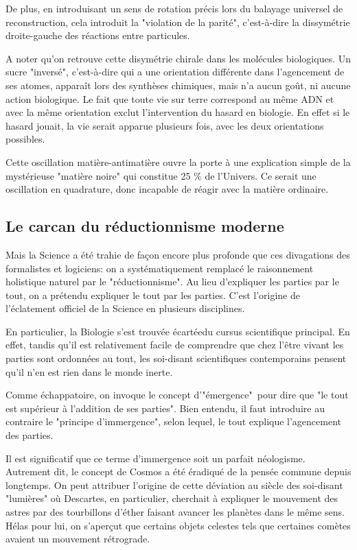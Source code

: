 \documentclass[a4paper,12pt]{article}
\begin{document}
De plus, en introduisant un sens de rotation précis lors du balayage universel de reconstruction, cela introduit la "violation de la parité", c'est-à-dire la dissymétrie droite-gauche des réactions entre particules. 

A noter qu'on retrouve cette disymétrie chirale dans les molécules biologiques. Un sucre "inversé", c'est-à-dire qui a une orientation différente dans l'agencement de ses atomes, apparaît lors des synthèses chimiques, mais n'a aucun goût, ni aucune action biologique. Le fait que toute vie sur terre correspond au même ADN et avec la même orientation exclut l'intervention du hasard en biologie. En effet si le hasard jouait, la vie serait apparue plusieurs fois, avec les deux orientations possibles.

Cette oscillation matière-antimatière ouvre la porte à une explication simple de la mystérieuse "matière noire" qui constitue 25 \% de l'Univers. Ce serait une oscillation en quadrature, donc incapable de réagir avec la matière ordinaire. 


\subsection{Le carcan du réductionnisme moderne}

    Mais la Science a été trahie de façon encore plus profonde que ces divagations des formalistes et logiciens: on a systématiquement remplacé le raisonnement holistique naturel par le "réductionnisme". Au lieu d'expliquer les parties par le tout, on a prétendu expliquer le tout par les parties. C'est l'origine de l'éclatement officiel de la Science en plusieurs disciplines.

     En particulier, la Biologie s'est trouvée écartéedu cursus scientifique principal.  En effet, tandis qu'il est relativement facile de comprendre que chez l'être vivant les parties sont ordonnées au tout, les soi-disant scientifiques contemporains pensent qu'il n'en est rien dans le monde inerte. 

    Comme échappatoire, on invoque le concept d'"émergence" pour dire que "le tout est supérieur à l'addition de ses parties". Bien entendu, il faut introduire au contraire le "principe d'immergence", selon lequel, le tout explique l'agencement des parties. 

    Il est significatif que ce terme d'immergence soit un parfait néologisme. Autrement dit, le concept de Cosmos a été éradiqué de la pensée commune depuis longtemps. On peut attribuer l'origine de cette déviation au siècle des soi-disant "lumières" où Descartes, en particulier, cherchait à expliquer le mouvement des astres par des tourbillons d'éther faisant avancer les planètes dans le même sens. Hélas pour lui, on s'aperçut que certains objets celestes tels que certaines comètes avaient un mouvement rétrograde.
\end{document}

